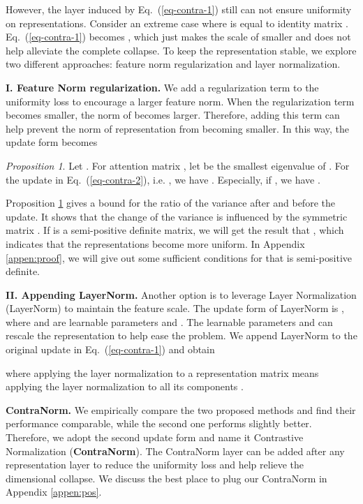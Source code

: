 \documentclass{article}
\theoremstyle{definition}
\theoremstyle{remark}
\theoremstyle{theorem}
\newtheorem{proposition}{Proposition}
\begin{document}
However, the layer induced by Eq.~(\ref{eq-contra-1}) still can not ensure uniformity on representations. Consider an extreme case where  is equal to identity matrix . Eq.~(\ref{eq-contra-1}) becomes , which just makes the scale of  smaller and does not help alleviate the complete collapse. To keep the representation stable, we explore two different approaches: feature norm regularization and layer normalization.

\textbf{I. Feature Norm regularization.} We add a regularization term  to the uniformity loss to encourage a larger feature norm. When the regularization term becomes smaller, the norm of  becomes larger. Therefore, adding this term can help prevent the norm of representation  from becoming smaller. In this way, the update form becomes

\begin{proposition}
\label{proposition:complete}
    Let . For attention matrix , let  be the smallest eigenvalue of  . For the update in Eq.~(\ref{eq-contra-2}), i.e. , we have . Especially, if , we have .
\end{proposition}
Proposition \ref{proposition:complete} gives a bound for the ratio of the variance after and before the update. It shows that the change of the variance is influenced by the symmetric matrix . If  is a semi-positive definite matrix, we will get the result that , which indicates that the representations become more uniform. In Appendix \ref{appen:proof}, we will give out some sufficient conditions for that  is semi-positive definite.

\textbf{II. Appending LayerNorm.} Another option is to leverage Layer Normalization (LayerNorm) \citep{ba2016layer} to maintain the feature scale. The update form of LayerNorm is , where  and  are learnable parameters and . The learnable parameters  and  can rescale the representation  to help ease the problem. We append LayerNorm to the original update in Eq.~(\ref{eq-contra-1}) and obtain

where applying the layer normalization to a representation matrix  means applying the layer normalization to all its components . 

\textbf{ContraNorm.} We empirically compare the two proposed methods and find their performance comparable, while the second one performs slightly better. Therefore, we adopt the second update form and name it Contrastive Normalization (\textbf{ContraNorm}). The ContraNorm layer can be added after any representation layer to reduce the uniformity loss and help relieve the dimensional collapse. We discuss the best place to plug our ContraNorm in Appendix \ref{appen:pos}. 
\end{document}
